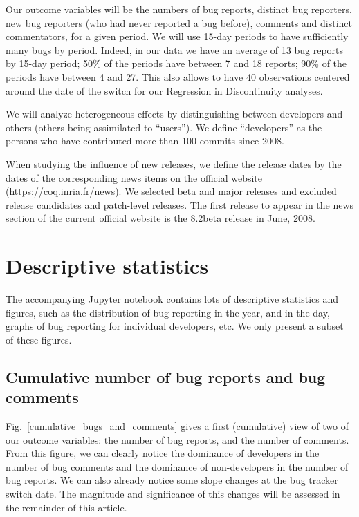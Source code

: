 \documentclass[runningheads]{llncs}
\begin{document}
Our outcome variables will be the numbers of bug reports, distinct bug reporters, new bug reporters (who had never reported a bug before), comments and distinct commentators, for a given period. We will use 15-day periods to have sufficiently many bugs by period. Indeed, in our data we have an average of 13 bug reports by 15-day period; 50\% of the periods have between 7 and 18 reports; 90\% of the periods have between 4 and 27. This also allows to have 40 observations centered around the date of the switch for our Regression in Discontinuity analyses.

We will analyze heterogeneous effects by distinguishing between developers and others (others being assimilated to ``users''). We define ``developers'' as the persons who have contributed more than 100 commits since 2008.

When studying the influence of new releases, we define the release dates by the dates of the corresponding news items on the official website (\url{https://coq.inria.fr/news}). We selected beta and major releases and excluded release candidates and patch-level releases. The first release to appear in the news section of the current official website is the 8.2beta release in June, 2008.

\section{Descriptive statistics}

The accompanying Jupyter notebook contains lots of descriptive statistics and figures, such as the distribution of bug reporting in the year, and in the day, graphs of bug reporting for individual developers, etc. We only present a subset of these figures.

\subsection{Cumulative number of bug reports and bug comments}

Fig.~\ref{cumulative_bugs_and_comments} gives a first (cumulative) view of two of our outcome variables: the number of bug reports, and the number of comments. From this figure, we can clearly notice the dominance of developers in the number of bug comments and the dominance of non-developers in the number of bug reports. We can also already notice some slope changes at the bug tracker switch date. The magnitude and significance of this changes will be assessed in the remainder of this article.
\end{document}
